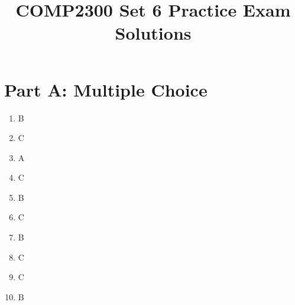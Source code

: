 \documentclass[11pt]{article}
\title{COMP2300 Set 6 Practice Exam Solutions}
\author{}
\date{}
\begin{document}
\maketitle

\section*{Part A: Multiple Choice}
\begin{enumerate}[label=\textbf{A\arabic*.}]
  \item B
  \item C
  \item A
  \item C
  \item B
  \item C
  \item B
  \item C
  \item C
  \item B
\end{enumerate}
\end{document}
